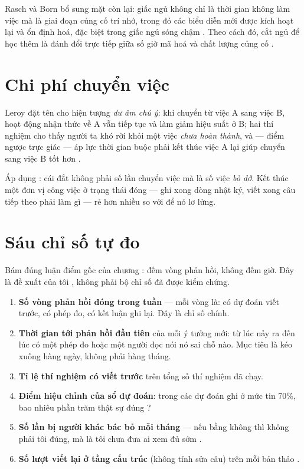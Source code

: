 \documentclass[../hieu-suat.tex]{subfiles}
\begin{document}
Rasch và Born \cite{rasch2013} bổ sung mặt còn lại: giấc ngủ không chỉ là thời gian không làm việc mà là giai đoạn củng cố trí nhớ, trong đó các biểu diễn mới được kích hoạt lại và ổn định hoá, đặc biệt trong giấc ngủ sóng chậm \nT{}. Theo cách đó, cắt ngủ để học thêm là đánh đổi trực tiếp giữa số giờ mã hoá và chất lượng củng cố \nM{}.

\section{Chi phí chuyển việc}

Leroy \cite{leroy2009} đặt tên cho hiện tượng \emph{dư âm chú ý}: khi chuyển từ việc A sang việc B, hoạt động nhận thức về A vẫn tiếp tục và làm giảm hiệu suất ở B; hai thí nghiệm cho thấy người ta khó rời khỏi một việc \emph{chưa hoàn thành}, và --- điểm ngược trực giác --- áp lực thời gian buộc phải kết thúc việc A lại giúp chuyển sang việc B tốt hơn \nD{}.

Áp dụng \nM{}: cái đắt không phải số lần chuyển việc mà là số việc \emph{bỏ dở}. Kết thúc một đơn vị công việc ở trạng thái đóng --- ghi xong dòng nhật ký, viết xong câu tiếp theo phải làm gì --- rẻ hơn nhiều so với để nó lơ lửng.

\section{Sáu chỉ số tự đo}

Bám đúng luận điểm gốc của chương : đếm vòng phản hồi, không đếm giờ. Đây là đề xuất của tôi \nM{}, không phải bộ chỉ số đã được kiểm chứng.

\begin{enumerate}
\item \textbf{Số vòng phản hồi đóng trong tuần} --- mỗi vòng là: có dự đoán viết trước, có phép đo, có kết luận ghi lại. Đây là chỉ số chính.
\item \textbf{Thời gian tới phản hồi đầu tiên} của mỗi ý tưởng mới: từ lúc nảy ra đến lúc có một phép đo hoặc một người đọc nói nó sai chỗ nào. Mục tiêu là kéo xuống hàng ngày, không phải hàng tháng.
\item \textbf{Tỉ lệ thí nghiệm có  viết trước} trên tổng số thí nghiệm đã chạy.
\item \textbf{Điểm hiệu chỉnh của sổ dự đoán}: trong các dự đoán ghi ở mức tin 70\%, bao nhiêu phần trăm thật sự đúng \cite{mellers2015}?
\item \textbf{Số lần bị người khác bác bỏ mỗi tháng} --- nếu bằng không thì không phải tôi đúng, mà là tôi chưa đưa ai xem đủ sớm \cite{mercier2011,dunbar1997} \nM{}.
\item \textbf{Số lượt viết lại ở tầng cấu trúc} (không tính sửa câu) trên mỗi bản thảo \cite{sommers1980}.
\end{enumerate}
\end{document}
